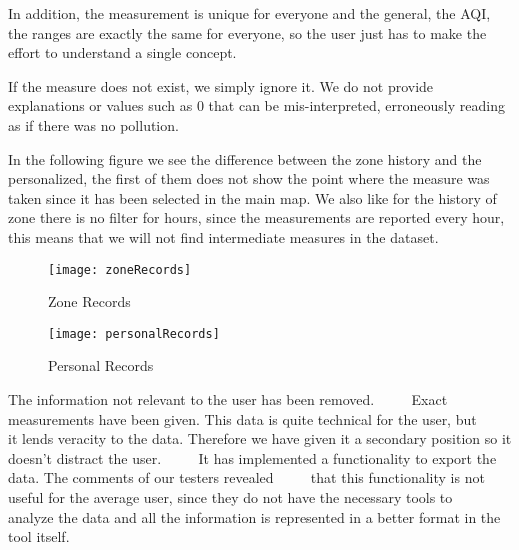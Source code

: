 In addition, the measurement is unique for everyone and the general, the AQI, the ranges are exactly the same for everyone, so the user just has to make the effort to understand a single concept.

If the measure does not exist, we simply ignore it. We do not provide explanations or values such as 0 that can be mis-interpreted, erroneously reading as if there was no pollution.


In the following figure we see the difference between the zone history and the personalized, the first of them does not show
the point where the measure was taken since it has been selected in the main map. We also like for the history of
zone there is no filter for hours, since the measurements are reported every hour, this means that we will not find
intermediate measures in the dataset.
\begin{figure}[ht]
    \centering
    \texttt{[image: zoneRecords]}
    \caption{Zone Records}
\end{figure}
\begin{figure}[ht]
    \centering
    \texttt{[image: personalRecords]}
    \caption{Personal Records}
\end{figure}


\begin{itemize}
    \done The information not relevant to the user has been removed.
         \crossed Exact measurements have been given. This data is quite technical for the user, but 
         it lends veracity to the data. Therefore we have given it a secondary position so it doesn't distract the user.
         \crossed It has implemented a functionality to export the data. The comments of our testers revealed
         that this functionality is not useful for the average user, since they do not have the necessary tools to
         analyze the data and all the information is represented in a better format in the tool itself.
    
\end{itemize}
